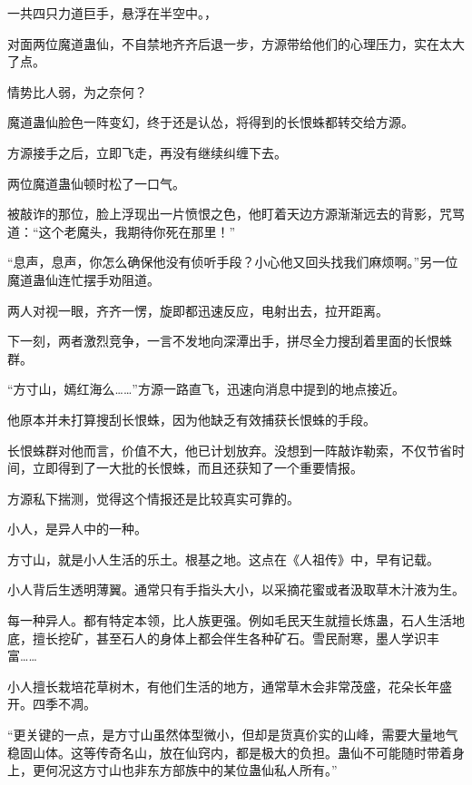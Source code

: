 
\begin{this_body}



一共四只力道巨手，悬浮在半空中。\male{}\male{}，

对面两位魔道蛊仙，不自禁地齐齐后退一步，方源带给他们的心理压力，实在太大了点。

情势比人弱，为之奈何？

魔道蛊仙脸色一阵变幻，终于还是认怂，将得到的长恨蛛都转交给方源。

方源接手之后，立即飞走，再没有继续纠缠下去。

两位魔道蛊仙顿时松了一口气。

被敲诈的那位，脸上浮现出一片愤恨之色，他盯着天边方源渐渐远去的背影，咒骂道：“这个老魔头，我期待你死在那里！”

“息声，息声，你怎么确保他没有侦听手段？小心他又回头找我们麻烦啊。”另一位魔道蛊仙连忙摆手劝阻道。

两人对视一眼，齐齐一愣，旋即都迅速反应，电射出去，拉开距离。

下一刻，两者激烈竞争，一言不发地向深潭出手，拼尽全力搜刮着里面的长恨蛛群。

“方寸山，嫣红海么……”方源一路直飞，迅速向消息中提到的地点接近。

他原本并未打算搜刮长恨蛛，因为他缺乏有效捕获长恨蛛的手段。

长恨蛛群对他而言，价值不大，他已计划放弃。没想到一阵敲诈勒索，不仅节省时间，立即得到了一大批的长恨蛛，而且还获知了一个重要情报。

方源私下揣测，觉得这个情报还是比较真实可靠的。

小人，是异人中的一种。

方寸山，就是小人生活的乐土。根基之地。这点在《人祖传》中，早有记载。

小人背后生透明薄翼。通常只有手指头大小，以采摘花蜜或者汲取草木汁液为生。

每一种异人。都有特定本领，比人族更强。例如毛民天生就擅长炼蛊，石人生活地底，擅长挖矿，甚至石人的身体上都会伴生各种矿石。雪民耐寒，墨人学识丰富……

小人擅长栽培花草树木，有他们生活的地方，通常草木会非常茂盛，花朵长年盛开。四季不凋。

“更关键的一点，是方寸山虽然体型微小，但却是货真价实的山峰，需要大量地气稳固山体。这等传奇名山，放在仙窍内，都是极大的负担。蛊仙不可能随时带着身上，更何况这方寸山也非东方部族中的某位蛊仙私人所有。”


\end{this_body}
